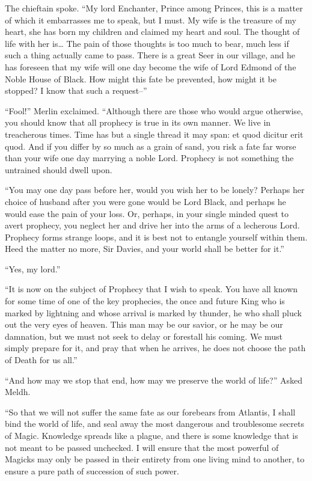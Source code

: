The chieftain spoke. “My lord Enchanter, Prince among Princes, this is a matter of which it embarrasses me to speak, but I must. My wife is the treasure of my heart, she has born my children and claimed my heart and soul. The thought of life with her is… The pain of those thoughts is too much to bear, much less if such a thing actually came to pass. There is a great Seer in our village, and he has foreseen that my wife will one day become the wife of Lord Edmond of the Noble House of Black. How might this fate be prevented, how might it be stopped? I know that such a request–”

“Fool!” Merlin exclaimed. “Although there are those who would argue otherwise, you should know that all prophecy is true in its own manner. We live in treacherous times. Time has but a single thread it may span: et quod dicitur erit quod. And if you differ by so much as a grain of sand, you risk a fate far worse than your wife one day marrying a noble Lord. Prophecy is not something the untrained should dwell upon.

“You may one day pass before her, would you wish her to be lonely? Perhaps her choice of husband after you were gone would be Lord Black, and perhaps he would ease the pain of your loss. Or, perhaps, in your single minded quest to avert prophecy, you neglect her and drive her into the arms of a lecherous Lord. Prophecy forms strange loops, and it is best not to entangle yourself within them. Heed the matter no more, Sir Davies, and your world shall be better for it.”

“Yes, my lord.”

“It is now on the subject of Prophecy that I wish to speak. You have all known for some time of one of the key prophecies, the once and future King who is marked by lightning and whose arrival is marked by thunder, he who shall pluck out the very eyes of heaven. This man may be our savior, or he may be our damnation, but we must not seek to delay or forestall his coming. We must simply prepare for it, and pray that when he arrives, he does not choose the path of Death for us all.”

“And how may we stop that end, how may we preserve the world of life?” Asked Meldh.

“So that we will not suffer the same fate as our forebears from Atlantis, I shall bind the world of life, and seal away the most dangerous and troublesome secrets of Magic. Knowledge spreads like a plague, and there is some knowledge that is not meant to be passed unchecked. I will ensure that the most powerful of Magicks may only be passed in their entirety from one living mind to another, to ensure a pure path of succession of such power.

